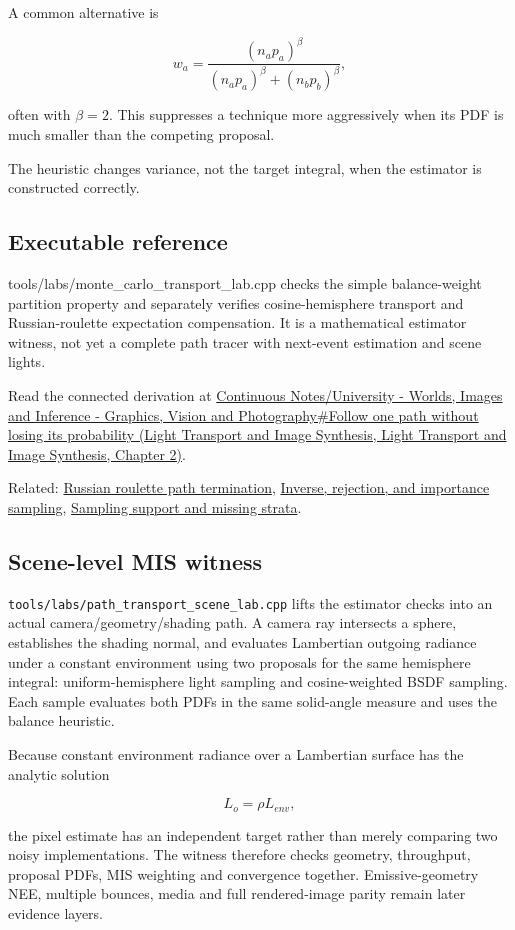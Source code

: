 A common alternative is

\[
w_a=
\frac{(n_a p_a)^\beta}
{(n_a p_a)^\beta+(n_b p_b)^\beta},
\]

often with \(\beta=2\). This suppresses a technique more aggressively when its PDF is much smaller than the competing proposal.

The heuristic changes variance, not the target integral, when the estimator is constructed correctly.

\subsection{Executable reference}\label{appendix-ca8898faf1a6-executable-reference}

tools/labs/monte\_carlo\_transport\_lab.cpp checks the simple balance-weight partition property and separately verifies cosine-hemisphere transport and Russian-roulette expectation compensation. It is a mathematical estimator witness, not yet a complete path tracer with next-event estimation and scene lights.

Read the connected derivation at \href{../04-Light-Transport-and-Image-Synthesis/main.pdf\#nameddest=03-visual-computing-i-ch007-follow-one-path-without-losing-its-probability}{Continuous Notes/University - Worlds, Images and Inference - Graphics, Vision and Photography\#Follow one path without losing its probability (Light Transport and Image Synthesis, Light Transport and Image Synthesis, Chapter 2)}.

Related: \hyperref[appendix-7277c62d4599]{Russian roulette path termination}, \hyperref[appendix-8d863ed954d0]{Inverse, rejection, and importance sampling}, \hyperref[appendix-10308c3d753e]{Sampling support and missing strata}.

\subsection{Scene-level MIS witness}\label{appendix-ca8898faf1a6-scene-level-mis-witness}

\texttt{tools/labs/path\_transport\_scene\_lab.cpp} lifts the estimator checks into an actual camera/geometry/shading path. A camera ray intersects a sphere, establishes the shading normal, and evaluates Lambertian outgoing radiance under a constant environment using two proposals for the same hemisphere integral: uniform-hemisphere light sampling and cosine-weighted BSDF sampling. Each sample evaluates both PDFs in the same solid-angle measure and uses the balance heuristic.

Because constant environment radiance over a Lambertian surface has the analytic solution

\[
L_o = \rho L_{env},
\]

the pixel estimate has an independent target rather than merely comparing two noisy implementations. The witness therefore checks geometry, throughput, proposal PDFs, MIS weighting and convergence together. Emissive-geometry NEE, multiple bounces, media and full rendered-image parity remain later evidence layers.
